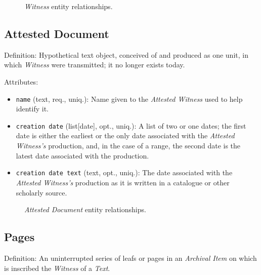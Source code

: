 \begin{figure}[ht]
    \begin{center}
        
    \end{center}
\label{fig:WitnessER}
\caption{\textit{Witness} entity relationships.}
\end{figure}


\subsection{Attested Document}

Definition: Hypothetical text object, conceived of and produced as one unit, in which \textit{Witness} were transmitted; it no longer exists today.

\vspace{1em}
\noindent Attributes:

\begin{itemize}
    \item \texttt{name} (text, req., uniq.): Name given to the \textit{Attested Witness} used to help identify it.
    \item \texttt{creation date} (list[date], opt., uniq.): A list of two or one dates; the first date is either the earliest or the only date associated with the \textit{Attested Witness's} production, and, in the case of a range, the second date is the latest date associated with the production.
    \item \texttt{creation date text} (text, opt., uniq.): The date associated with the \textit{Attested Witness's} production as it is written in a catalogue or other scholarly source.
\end{itemize}

\begin{figure}[ht]
    \begin{center}
        
    \end{center}
\label{fig:AttestedDocumentER}
\caption{\textit{Attested Document} entity relationships.}
\end{figure}


\subsection{Pages}

Definition: An uninterrupted series of leafs or pages in an \textit{Archival Item} on which is inscribed the \textit{Witness} of a \textit{Text}.

